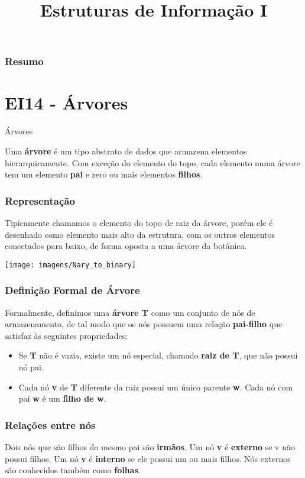 \documentclass{beamer}
\title[\sc{Estruturas de Informação I}]{Estruturas de Informação I}
\subtitle{\tituloaula}
\newcommand{\tituloaula}{\'{A}rvores}
\begin{document}
\begin{frame}
  \titlepage 
\end{frame}

\begin{frame}
	\frametitle{Resumo}
	\tableofcontents
\end{frame}

\section{EI14 -  \tituloaula}
\begin{frame}
	\LARGE{\alert{\tituloaula}}
	\normalsize
	
Uma \textbf{árvore} é um tipo abstrato de dados que armazena elementos hierarquicamente.  Com exceção do elemento do topo, cada elemento numa árvore tem um elemento \textbf{pai} e zero ou mais elementos \textbf{filhos}.	


\end{frame}


\begin{frame}
\frametitle{Representação}
Tipicamente chamamos o elemento do topo de raiz da árvore, porém ele é desenhado como elemento mais alto da estrutura, com os outros elementos conectados para baixo, de forma oposta a uma árvore da botânica.

\texttt{[image: imagens/Nary\_to\_binary]}
\end{frame}

\begin{frame}
\frametitle{Definição Formal de Árvore}
Formalmente, definimos uma \textbf{árvore T} como um conjunto de nós de armazenamento, de tal modo que os nós possuem uma relação \textbf{pai-filho} que satisfaz às seguintes propriedades:
\begin{itemize}
\item Se \textbf{T} não é vazia, existe um nó especial, chamado \textbf{raiz de T}, que não possui nó pai.
\item Cada nó \textbf{v} de \textbf{T} diferente da raiz possui um único parente \textbf{w}. Cada nó com pai \textbf{w} é um \textbf{filho de w}.
\end{itemize}

\end{frame}

\begin{frame}
\frametitle{Relações entre nós}
Dois nós que são filhos do mesmo pai são \textbf{irmãos}. Um nó \textbf{v} é \textbf{externo} se v não possui filhos. Um nó \textbf{v} é \textbf{interno} se ele possui um ou mais filhos. Nós externos são conhecidos também como \textbf{folhas}.


\end{frame}
\end{document}
